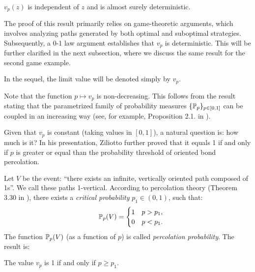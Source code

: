         \begin{theorem}\label{theorem-vz-independent-z-game1}
            $v_p(z)$ is independent of $z$ and is almost surely deterministic. 
        \end{theorem}

        The proof of this result primarily relies on game-theoretic arguments, which involves analyzing paths generated by both optimal and suboptimal strategies. Subsequently, a 0-1 law argument establishes that $v_p$ is deterministic. This will be further clarified in the next subsection, where we discuss the same result for the second game example.

        In the sequel, the limit value will be denoted simply by $v_p$.

        \begin{remark}\label{remark_v_p_non_decreasing}
           Note that the function $p \mapsto v_p$ is non-decreasing. This follows from the result stating that the parametrized family of probability measures $\{\mathbb{P}_p\}_{p \in [0, 1]}$ can be coupled in an increasing way (see, for example, Proposition 2.1. in \cite{DuminilCopin2018}). 
        \end{remark}

        Given that $v_p$ is constant (taking values in $[0, 1]$), a natural question is: how much is it? In his presentation, Ziliotto further proved that it equals 1 if and only if $p$ is greater or equal than the probability threshold of oriented bond percolation. 

        Let $V$ be the event: ``there exists an infinite, vertically oriented path composed of 1s''. We call these paths 1-vertical. According to percolation theory (Theorem 3.30 in \cite{Grimmett2018}), there exists a \emph{critical probability} $p_1 \in (0, 1)$, such that:
        \begin{equation}\label{percolation-probability-1-vertical}
                \quad \mathbb{P}_p(V) = \begin{cases}
                                    1       & p > p_1,\\  
                                    0       & p < p_1.
                                \end{cases}
        \end{equation}
        The function $\mathbb{P}_p(V)$ (as a function of $p$) is called \emph{percolation probability}. The result is:

        \begin{theorem} \label{theorem-v1-p1}
            The value $v_p$ is 1 if and only if $p \geq p_1$. 
        \end{theorem}


